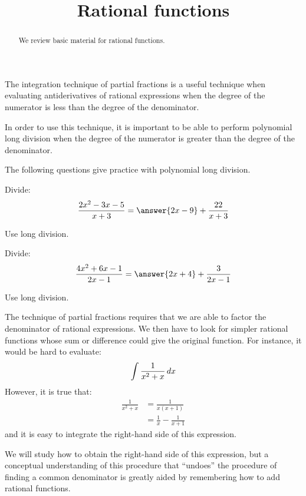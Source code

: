\documentclass{ximera}
\title[Refresh:]{Rational functions}
\begin{document}
\begin{abstract}
  We review basic material for rational functions.
\end{abstract}
\maketitle

\begin{problem}
  The integration technique of partial fractions is a useful technique
  when evaluating antiderivatives of rational expressions when the
  degree of the numerator is less than the degree of the denominator.
  
  In order to use this​ technique, it is important to be able to
  perform polynomial long division when the degree of the numerator is
  greater than the degree of the denominator.  
  
  The following questions give practice with polynomial long division.
  \begin{multipleChoice}
  \end{multipleChoice}
\end{problem}

\begin{problem}
  Divide:
  \[
  \frac{2x^2-3x-5}{x+3} = \answer{2x-9} + \frac{22}{x+3}
  \]
  \begin{hint}
    Use long division.
  \end{hint}
\end{problem}

\begin{problem}
  Divide:
  \[
  \frac{4x^2+6x-1}{2x-1} = \answer{2x+4} + \frac{3}{2x-1}
  \]
  \begin{hint}
    Use long division.
  \end{hint}
\end{problem}

\begin{problem}
  The technique of partial fractions requires that we are able to
  factor the denominator of rational expressions.  We then have to
  look for simpler rational functions whose sum or difference could
  give the original function.  For​ instance, it would be hard to​
  evaluate:
  \[
  \int \frac{1}{x^2+x}\mathop{}\!d x
  \]
  ​However, it is true​ that:
  \begin{align*}
    \frac{1}{x^2+x} &= \frac{1}{x(x+1)}\\
    &=\frac{1}{x}-\frac{1}{x+1}
  \end{align*}
  and it is easy to integrate the right-hand side of this expression.

  
  We will study how to obtain the right-hand side of this​ expression,
  but a conceptual understanding of this procedure that​ ``undoes'' the
  procedure of finding a common denominator is greatly aided by
  remembering how to add rational functions.
  \begin{multipleChoice}
  \end{multipleChoice}
\end{problem}
\end{document}
